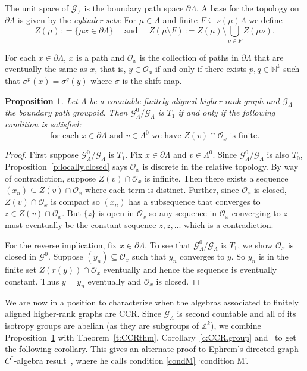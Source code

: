 \documentclass[11pt,reqno]{amsart}
\theoremstyle{plain}
\newtheorem{prop}[thm]{Proposition}
\numberwithin{equation}{section}
\newcommand{\G}[0]{\mathscr{G}}
\newcommand{\orb}[0]{\mathcal{O}}
\begin{document}
The unit space of $\G_{\Lambda}$ is the boundary path space $\partial \Lambda$.  A base for the topology on $\partial \Lambda$ is given by the \emph{cylinder sets}:
For $\mu \in \Lambda$ and finite $F \subseteq s(\mu)\Lambda$ we define
\[Z(\mu) : = \{\mu x \in \partial\Lambda\}  \quad \text{ and } \quad Z(\mu \setminus F) := Z(\mu) \setminus \bigcup_{\nu \in F}Z(\mu\nu).\]

For each $x \in \partial\Lambda$, $x$ is a path and $\orb_x$ is the collection of paths in $\partial\Lambda$ that are eventually the same as $x$, that is, $y \in \orb_x$ if and only if there exists
$p,q \in \mathbb{N}^k$ such that $\sigma^p(x)=\sigma^q(y)$ where $\sigma$ is the shift map.

\begin{prop}
\label{p:condM}
Let $\Lambda$ be a countable finitely aligned higher-rank graph  and $\G_{\Lambda}$ the boundary path groupoid.  Then $\G^{0}_{\Lambda}/\G_{\Lambda}$ is $T_1$ if and only if the following condition is satisfied:
\begin{equation}
\label{condM}	
\text{for each $x \in \partial\Lambda$ and $v \in \Lambda^0$ we have $Z(v)\cap \orb_x$ is finite.}
\end{equation}
\end{prop}
\begin{proof}
First suppose $\G^{0}_{\Lambda}/\G_{\Lambda}$ is $T_1$. Fix $x \in \partial\Lambda$ and $v \in \Lambda^0$.    Since $\G^{0}_{\Lambda}/\G_{\Lambda}$ is also $T_0$, Proposition~\ref{p:locally.closed} says $\orb_x$ is discrete in the relative topology.  By way of contradiction, suppose $Z(v) \cap \orb_x$ is infinite.  Then there exists a sequence $(x_n) \subseteq Z(v) \cap \orb_x$ where each term is distinct.
 Further, since $\orb_x$ is closed, $Z(v) \cap \orb_x$ is compact so $(x_n)$ has a subsequence that converges to $z \in Z(v) \cap \orb_x$.  But $\{z\}$ is open in $\orb_x$ so any sequence in $\orb_x$ converging to $z$ must eventually be the constant sequence $z,z,...$ which is a contradiction.


For the reverse implication, fix $x \in \partial\Lambda$.  To see that  $\G^{0}_{\Lambda}/\G_{\Lambda}$ is $T_1$, we show $\orb_x$ is closed in $\G^0$.  Suppose $(y_n) \subseteq \orb_x$ such that $y_n$ converges to $y$.  So $y_n$ is in the finite set $ Z(r(y)) \cap \orb_x$ eventually and hence the sequence is eventually constant.  Thus $y=y_n$ eventually and $\orb_x$ is closed.
\end{proof}


We are now in a position to characterize when the algebras associated to finitely aligned higher-rank graphs are CCR.  Since $\G_{\Lambda}$ is second countable and all of its isotropy groups are abelian (as they are subgroups of $\mathbb{Z}^k$), we combine Proposition~\ref{p:condM} with Theorem~\ref{t:CCRthm}, Corollary~\ref{c:CCR.group} and~\cite[Theorem~6.1]{Cl07} to get the following corollary.  This gives an alternate proof to Ephrem's directed graph $C^{\ast}$-algebra result~\cite[Theorem~5.5]{Eph04}, where he calls condition \eqref{condM} `condition M'.
\end{document}
